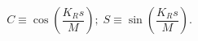\begin{equation}
\label{sc}
C\equiv \cos (\frac{K_Rs}{M});\;S\equiv \sin (\frac{K_Rs}{M}). 
\end{equation}

